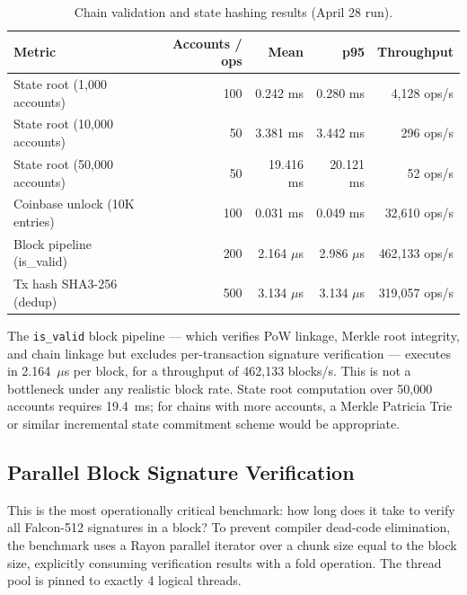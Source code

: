 \documentclass[11pt,a4paper]{article}
\begin{document}
\begin{table}[h]
\centering\small
\begin{tabular}{@{}lrrrr@{}}
\toprule
\textbf{Metric} & \textbf{Accounts / ops} & \textbf{Mean} & \textbf{p95} & \textbf{Throughput} \\
\midrule
State root (1,000 accounts)  & 100 & 0.242 ms & 0.280 ms & 4,128 ops/s \\
State root (10,000 accounts) & 50  & 3.381 ms & 3.442 ms & 296 ops/s \\
State root (50,000 accounts) & 50  & 19.416 ms & 20.121 ms & 52 ops/s \\
Coinbase unlock (10K entries)& 100 & 0.031 ms & 0.049 ms & 32,610 ops/s \\
Block pipeline (is\_valid)   & 200 & 2.164 $\mu$s & 2.986 $\mu$s & 462,133 ops/s \\
Tx hash SHA3-256 (dedup)     & 500 & 3.134 $\mu$s & 3.134 $\mu$s & 319,057 ops/s \\
\bottomrule
\end{tabular}
\caption{Chain validation and state hashing results (April 28 run).}
\label{tab:chain}
\end{table}

The \texttt{is\_valid} block pipeline --- which verifies PoW linkage, Merkle
root integrity, and chain linkage but excludes per-transaction signature
verification --- executes in 2.164~$\mu$s per block, for a throughput of
462,133 blocks/s. This is not a bottleneck under any realistic block rate.
State root computation over 50,000 accounts requires 19.4~ms; for chains
with more accounts, a Merkle Patricia Trie or similar incremental state
commitment scheme would be appropriate.

\subsection{Parallel Block Signature Verification}

This is the most operationally critical benchmark: how long does it take to
verify all Falcon-512 signatures in a block? To prevent compiler dead-code elimination, the benchmark uses a Rayon parallel iterator over a chunk size equal to the block size, explicitly consuming verification results with a fold operation. The thread pool is pinned to exactly 4 logical threads.
\end{document}
